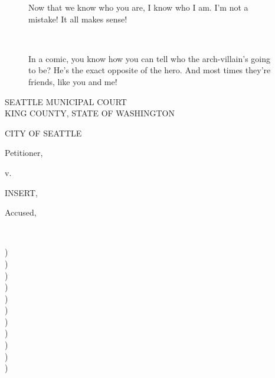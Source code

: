 \documentclass{article}
\newcommand{\tab}{\hspace*{.5in}}
\newenvironment{tightcenter}{%
	\setlength\topsep{0pt}
	\setlength\parskip{0pt}
		\begin{center}
		}{%
		\end{center}
		}
\newcommand{\rulesep}{\unskip\ \vrule\ }
\begin{document}
\begin{figure*}[ht!]
\begin{subfigure}[t]{0.32\textwidth}

    Now that we know who you are, I know who I am. I'm not a mistake!
    It all makes sense!
\end{subfigure}
\rulesep
\begin{subfigure}[t]{0.32\textwidth}

    In a comic, you know how you can tell who the arch-villain's going to be?
    He's the exact opposite of the hero. And most times they're friends,
    like you and me!
\end{subfigure}

\vspace*{18mm}

\begin{tightcenter}
SEATTLE MUNICIPAL COURT \\ KING COUNTY, STATE OF WASHINGTON
\end{tightcenter}

\vspace*{16.25mm}

	{
\begin{minipage}[t]{3in}

CITY OF SEATTLE


\tab \tab \tab Petitioner,

\tab \tab v.

INSERT,

\tab \tab \tab Accused,

\makebox[3in]{\hrulefill}
\rulesep
\begin{subfigure}[t]{0.32\textwidth}
\end{subfigure}
\newcommand{\rulesep}{\unskip\ \vrule height -1ex\ }

	\begin{minipage}[t]{5mm}
		\begin{singlespace*}
			)\\)\\)\\)\\)\\)\\)\\)\\)\\)\\)
		\end{singlespace*}
	\end{minipage}
\begin{minipage}[t]{3in}


\end{minipage}
\end{minipage}}
\end{figure*}
\end{document}
